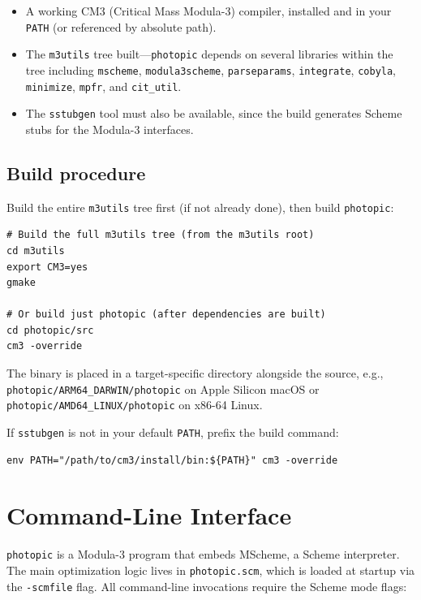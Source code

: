 \documentclass[11pt]{article}
\newcommand{\photopic}{\texttt{photopic}}
\newcommand{\cmd}[1]{\texttt{#1}}
\newcommand{\file}[1]{\texttt{#1}}
\begin{document}
\begin{itemize}
  \item A working CM3 (Critical Mass Modula-3) compiler, installed and
    in your \cmd{PATH} (or referenced by absolute path).
  \item The \cmd{m3utils} tree built---\photopic{} depends on several
    libraries within the tree including \cmd{mscheme},
    \cmd{modula3scheme}, \cmd{parseparams}, \cmd{integrate},
    \cmd{cobyla}, \cmd{minimize}, \cmd{mpfr}, and \cmd{cit\_util}.
  \item The \cmd{sstubgen} tool must also be available, since the build
    generates Scheme stubs for the Modula-3 interfaces.
\end{itemize}

\subsection{Build procedure}

Build the entire \cmd{m3utils} tree first (if not already done), then
build \photopic{}:

\begin{lstlisting}[style=shell]
# Build the full m3utils tree (from the m3utils root)
cd m3utils
export CM3=yes
gmake

# Or build just photopic (after dependencies are built)
cd photopic/src
cm3 -override
\end{lstlisting}

The binary is placed in a target-specific directory alongside the source,
e.g., \file{photopic/\allowbreak{}ARM64\_DARWIN/\allowbreak{}photopic}
on Apple Silicon macOS or
\file{photopic/\allowbreak{}AMD64\_LINUX/\allowbreak{}photopic}
on x86-64 Linux.

If \cmd{sstubgen} is not in your default \cmd{PATH}, prefix the build
command:

\begin{lstlisting}[style=shell]
env PATH="/path/to/cm3/install/bin:${PATH}" cm3 -override
\end{lstlisting}

\section{Command-Line Interface}
\label{sec:cli}

\photopic{} is a Modula-3 program that embeds MScheme, a Scheme
interpreter.  The main optimization logic lives in
\file{photopic.scm}, which is loaded at startup via the \cmd{-scmfile}
flag.  All command-line invocations require the Scheme mode flags:
\end{document}
